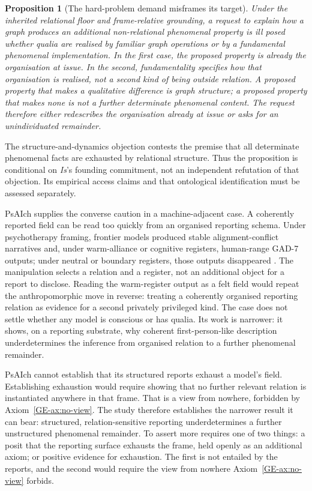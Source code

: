 \documentclass[11pt,a4paper]{article}
\newtheorem{proposition}[definition]{Proposition}
\theoremstyle{remark}\newtheorem{remark}[definition]{Remark}
\begin{document}
\begin{proposition}[The hard-problem demand misframes its target]\label{prop:hard-problem}
Under the inherited relational floor and frame-relative grounding, a request to
explain how a graph produces an additional non-relational phenomenal property is
ill posed whether qualia are realised by familiar graph operations or by a
fundamental phenomenal implementation. In the first case, the proposed property
is already the organisation at issue. In the second, fundamentality specifies how
that organisation is realised, not a second kind of being outside relation. A
proposed property that makes a qualitative difference is graph structure; a
proposed property that makes none is not a further determinate phenomenal content.
The request therefore either redescribes the organisation already at issue or asks
for an unindividuated remainder.
\end{proposition}
The structure-and-dynamics objection contests the premise that all determinate
phenomenal facts are exhausted by relational structure. Thus the proposition
is conditional on \emph{Is}'s founding commitment, not an independent
refutation of that objection. Its empirical access claims and that
ontological identification must be assessed separately.



PsAIch supplies the converse caution in a machine-adjacent case. A coherently
reported field can be read too quickly from an organised reporting schema. Under
psychotherapy framing, frontier models produced stable alignment-conflict
narratives and, under warm-alliance or cognitive registers, human-range GAD-7
outputs; under neutral or boundary registers, those outputs disappeared
\cite{khadangi2025}. The manipulation selects a relation and a register, not an
additional object for a report to disclose. Reading the warm-register output as a
felt field would repeat the anthropomorphic move in reverse: treating a
coherently organised reporting relation as evidence for a second privately
privileged kind. The case does not settle whether any model is conscious or has
qualia. Its work is narrower: it shows, on a reporting substrate, why coherent
first-person-like description underdetermines the inference from organised
relation to a further phenomenal remainder.

PsAIch cannot establish that its structured reports exhaust a model's field.
Establishing exhaustion would require showing that no further relevant relation is
instantiated anywhere in that frame. That is a view from nowhere, forbidden by
Axiom~\ref{GE-ax:no-view}. The study therefore establishes the narrower result it
can bear: structured, relation-sensitive reporting underdetermines a further
unstructured phenomenal remainder. To assert more requires one of two things: a
posit that the reporting surface exhausts the frame, held openly as an additional
axiom; or positive evidence for exhaustion. The first is not entailed by the
reports, and the second would require the view from nowhere Axiom~\ref{GE-ax:no-view}
forbids.
\end{document}
